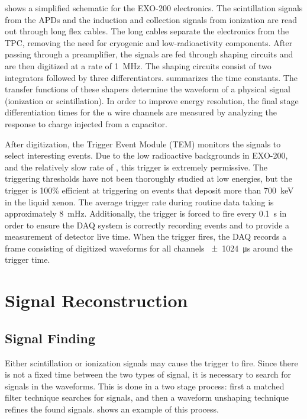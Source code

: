 \documentclass[herrin-thesis.tex]{subfiles}
\begin{document}
 shows a simplified schematic for the EXO-200 electronics. The scintillation signals from the APDs and the induction and collection signals from ionization are read out through long flex cables. The long cables separate the electronics from the TPC, removing the need for cryogenic and low-radioactivity components. After passing through a preamplifier, the signals are fed through shaping circuits and are then digitized at a rate of \SI{1}{\MHz}. The shaping circuits consist of two integrators followed by three differentiators.  summarizes the time constants.  The transfer functions of these shapers determine the waveform of a physical signal (ionization or scintillation). In order to improve energy resolution, the final stage differentiation times for the \(u\) wire channels are measured by analyzing the response to charge injected from a capacitor.

After digitization, the Trigger Event Module (TEM) monitors the signals to select interesting events. Due to the low radioactive backgrounds in EXO-200, and the relatively slow rate of \twonu, this trigger is extremely permissive. The triggering thresholds have not been thoroughly studied at low energies, but the trigger is 100\% efficient at triggering on events that deposit more than \SI{700}{\keV} in the liquid xenon. The average trigger rate during routine data taking is approximately \SI{8}{\mHz}. Additionally, the trigger is forced to fire every \SI{0.1}{\s} in order to ensure the DAQ system is correctly recording events and to provide a measurement of detector live time. When the trigger fires, the DAQ records a frame consisting of digitized waveforms for all channels \SI{\pm1024}{\micro\s} around the trigger time.

\section{Signal Reconstruction}
\label{sec:data_reconstruction}
\subsection{Signal Finding}
Either scintillation or ionization signals may cause the trigger to fire. Since there is not a fixed time between the two types of signal, it is necessary to search for signals in the waveforms. This is done in a two stage process: first a matched filter technique searches for signals, and then a waveform unshaping technique refines the found signals.  shows an example of this process.
\end{document}
